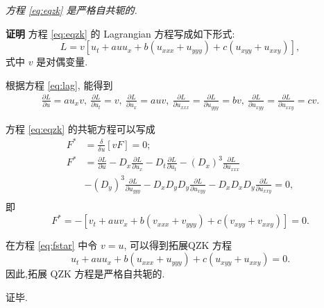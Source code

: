 \begin{theorem}
\emph{方程 \eqref{eq:eqzk} 是严格自共轭的.}
\end{theorem}

{\textbf{证明}} 方程 \eqref{eq:eqzk} 的 Lagrangian 方程写成如下形式:
\begin{equation}\label{eq:lag}
L=v[u_{t}+auu_{x}+b(u_{xxx}+u_{yyy})+c(u_{xyy}+u_{xxy})],
\end{equation}
式中 $v$ 是对偶变量.

根据方程 \eqref{eq:lag}, 能得到
\begin{align*}
\frac{\partial L}{\partial u}=au_{x}v,~\frac{\partial L}{\partial u_{t}}=v, ~\frac{\partial L}{\partial u_{x}}=auv,~
\frac{\partial L}{\partial u_{xxx}}=\frac{\partial L}{\partial u_{yyy}}=bv,~\frac{\partial L}{\partial u_{xyy}}=\frac{\partial L}{\partial u_{xxy}}=cv.
\end{align*}

方程 \eqref{eq:eqzk} 的共轭方程可以写成
\begin{equation*}
\begin{aligned}
F^{*}&=\frac{\delta}{\delta u}[vF]=0;\\
F^{*}&=\frac{\partial L}{\partial u}-D_{x}\frac{\partial L}{\partial u_{x}}-D_{t}\frac{\partial L}{\partial u_{t}}-(D_{x})^{3}\frac{\partial L}{\partial u_{xxx}}\\
&-(D_{y})^{3}\frac{\partial L}{\partial u_{yyy}}-D_{x}D_{y}D_{y}\frac{\partial L}{\partial u_{xyy}}-D_{x}D_{x}D_{y}\frac{\partial L}{\partial u_{xxy}}=0,\\
\end{aligned}
\end{equation*}
即
\begin{equation}\label{eq:fstar}
F^{*}=-[v_{t}+auv_{x}+b(v_{xxx}+v_{yyy})+c(v_{xyy}+v_{xxy})]=0.
\end{equation}

在方程 \eqref{eq:fstar} 中令 $v=u$, 可以得到拓展QZK 方程
\begin{equation*}
u_{t}+auu_{x}+b(u_{xxx}+u_{yyy})+c(u_{xyy}+u_{xxy})=0.
\end{equation*}
因此,拓展 QZK 方程是严格自共轭的.

证毕.

